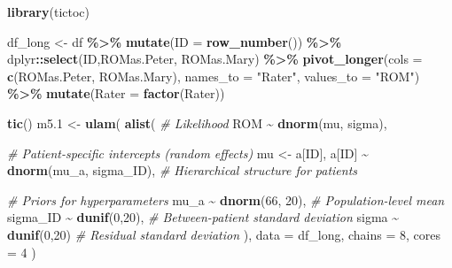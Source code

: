\documentclass[
]{article}
\newenvironment{Shaded}{\begin{snugshade}}{\end{snugshade}}
\newcommand{\AttributeTok}[1]{\textcolor[rgb]{0.13,0.29,0.53}{#1}}
\newcommand{\CommentTok}[1]{\textcolor[rgb]{0.56,0.35,0.01}{\textit{#1}}}
\newcommand{\DecValTok}[1]{\textcolor[rgb]{0.00,0.00,0.81}{#1}}
\newcommand{\FloatTok}[1]{\textcolor[rgb]{0.00,0.00,0.81}{#1}}
\newcommand{\FunctionTok}[1]{\textcolor[rgb]{0.13,0.29,0.53}{\textbf{#1}}}
\newcommand{\NormalTok}[1]{#1}
\newcommand{\OtherTok}[1]{\textcolor[rgb]{0.56,0.35,0.01}{#1}}
\newcommand{\SpecialCharTok}[1]{\textcolor[rgb]{0.81,0.36,0.00}{\textbf{#1}}}
\newcommand{\StringTok}[1]{\textcolor[rgb]{0.31,0.60,0.02}{#1}}
\begin{document}
\begin{Shaded}
\begin{Highlighting}[]
\FunctionTok{library}\NormalTok{(tictoc)}

\NormalTok{df\_long }\OtherTok{\textless{}{-}}\NormalTok{ df }\SpecialCharTok{\%\textgreater{}\%} 
  \FunctionTok{mutate}\NormalTok{(}\AttributeTok{ID =} \FunctionTok{row\_number}\NormalTok{()) }\SpecialCharTok{\%\textgreater{}\%}
\NormalTok{  dplyr}\SpecialCharTok{::}\FunctionTok{select}\NormalTok{(ID,ROMas.Peter, ROMas.Mary) }\SpecialCharTok{\%\textgreater{}\%} 
  \FunctionTok{pivot\_longer}\NormalTok{(}\AttributeTok{cols =} \FunctionTok{c}\NormalTok{(ROMas.Peter, ROMas.Mary), }
               \AttributeTok{names\_to =} \StringTok{"Rater"}\NormalTok{, }\AttributeTok{values\_to =} \StringTok{"ROM"}\NormalTok{) }\SpecialCharTok{\%\textgreater{}\%} 
  \FunctionTok{mutate}\NormalTok{(}\AttributeTok{Rater =} \FunctionTok{factor}\NormalTok{(Rater))}

\FunctionTok{tic}\NormalTok{()}
\NormalTok{m5}\FloatTok{.1} \OtherTok{\textless{}{-}} \FunctionTok{ulam}\NormalTok{(}
  \FunctionTok{alist}\NormalTok{(}
    \CommentTok{\# Likelihood}
\NormalTok{    ROM }\SpecialCharTok{\textasciitilde{}} \FunctionTok{dnorm}\NormalTok{(mu, sigma),}
    
    \CommentTok{\# Patient{-}specific intercepts (random effects)}
\NormalTok{    mu }\OtherTok{\textless{}{-}}\NormalTok{ a[ID],  }
\NormalTok{    a[ID] }\SpecialCharTok{\textasciitilde{}} \FunctionTok{dnorm}\NormalTok{(mu\_a, sigma\_ID),  }\CommentTok{\# Hierarchical structure for patients}
    
    \CommentTok{\# Priors for hyperparameters}
\NormalTok{    mu\_a }\SpecialCharTok{\textasciitilde{}} \FunctionTok{dnorm}\NormalTok{(}\DecValTok{66}\NormalTok{, }\DecValTok{20}\NormalTok{),  }\CommentTok{\# Population{-}level mean}
\NormalTok{    sigma\_ID }\SpecialCharTok{\textasciitilde{}} \FunctionTok{dunif}\NormalTok{(}\DecValTok{0}\NormalTok{,}\DecValTok{20}\NormalTok{),  }\CommentTok{\# Between{-}patient standard deviation}
\NormalTok{    sigma }\SpecialCharTok{\textasciitilde{}} \FunctionTok{dunif}\NormalTok{(}\DecValTok{0}\NormalTok{,}\DecValTok{20}\NormalTok{)  }\CommentTok{\# Residual standard deviation}
\NormalTok{  ), }
  \AttributeTok{data =}\NormalTok{ df\_long, }
  \AttributeTok{chains =} \DecValTok{8}\NormalTok{, }\AttributeTok{cores =} \DecValTok{4}
\NormalTok{)}
\end{Highlighting}
\end{Shaded}
\end{document}
